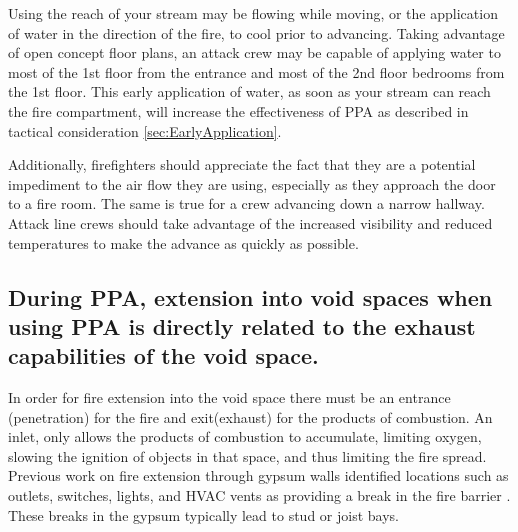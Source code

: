 \documentclass{article}
\begin{document}
Using the reach of your stream may be flowing while moving, or the application of water in the direction of the fire, to cool prior to advancing. Taking advantage of open concept floor plans, an attack crew may be capable of applying water to most of the 1st floor from the entrance and most of the 2nd floor bedrooms from the 1st floor.  This early application of water, as soon as your stream can reach the fire compartment, will increase the effectiveness of PPA as described in tactical consideration \ref{sec:EarlyApplication}.

Additionally, firefighters should appreciate the fact that they are a potential impediment to the air flow they are using, especially as they approach the door to a fire room. The same is true for a crew advancing down a narrow hallway. Attack line crews should take advantage of the increased visibility and reduced temperatures to make the advance as quickly as possible.

\subsection{During PPA, extension into void spaces when using PPA is directly related to the exhaust capabilities of the void space.} \label{TC:Extension_Into_Voids}
In order for fire extension into the void space there must be an entrance (penetration) for the fire and exit(exhaust) for the products of combustion. An inlet, only allows the products of combustion to accumulate, limiting oxygen, slowing the ignition of objects in that space, and thus limiting the fire spread. Previous work on fire extension through gypsum walls identified locations such as outlets, switches, lights, and HVAC vents as providing a break in the fire barrier\cite{DHS2011} \cite{WeinschenkStrongVentFlowFires}.  These breaks in the gypsum typically lead to stud or joist bays. 
\end{document}
